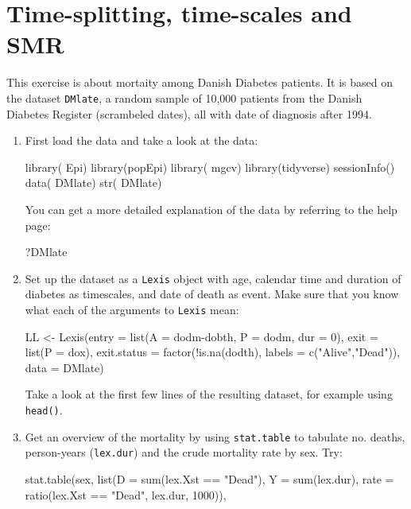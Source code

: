 
\renewcommand{\rwpre}{./graph/DMDK}
\section{Time-splitting, time-scales and SMR}
This exercise is about mortaity among Danish Diabetes patients. It is
based on the dataset \texttt{DMlate}, a random sample of 10,000
patients from the Danish Diabetes Register (scrambeled dates), all
with date of diagnosis after 1994.
\begin{enumerate}
\item First load the data and take a look at the data:
\begin{Schunk}
\begin{Sinput}
 library( Epi)
 library(popEpi)
 library( mgcv)
 library(tidyverse)
 sessionInfo()
 data( DMlate)
 str( DMlate)
\end{Sinput}
\end{Schunk}
You can get a more detailed explanation of the data by referring to
the help page:
\begin{Schunk}
\begin{Sinput}
 ?DMlate
\end{Sinput}
\end{Schunk}
\item Set up the dataset as a \texttt{Lexis} object with age, calendar
  time and duration of diabetes as timescales, and date of death as
  event. Make sure that you know what each of the arguments to
  \texttt{Lexis} mean:
\begin{Schunk}
\begin{Sinput}
 LL <- Lexis(entry = list(A = dodm-dobth,
                          P = dodm,
                        dur = 0),
              exit = list(P = dox),
       exit.status = factor(!is.na(dodth),
                            labels = c("Alive","Dead")),
              data = DMlate)
\end{Sinput}
\end{Schunk}
Take a look at the first few lines of the resulting dataset, for
example using \texttt{head()}.
\item Get an overview of the mortality by using \texttt{stat.table}
  to tabulate no. deaths, person-years (\texttt{lex.dur}) and the
  crude mortality rate by sex. Try:
\begin{Schunk}
\begin{Sinput}
 stat.table(sex,
            list(D = sum(lex.Xst == "Dead"),
                 Y = sum(lex.dur),
              rate = ratio(lex.Xst == "Dead", lex.dur, 1000)),

\end{Sinput}
\end{Schunk}
\end{enumerate}
